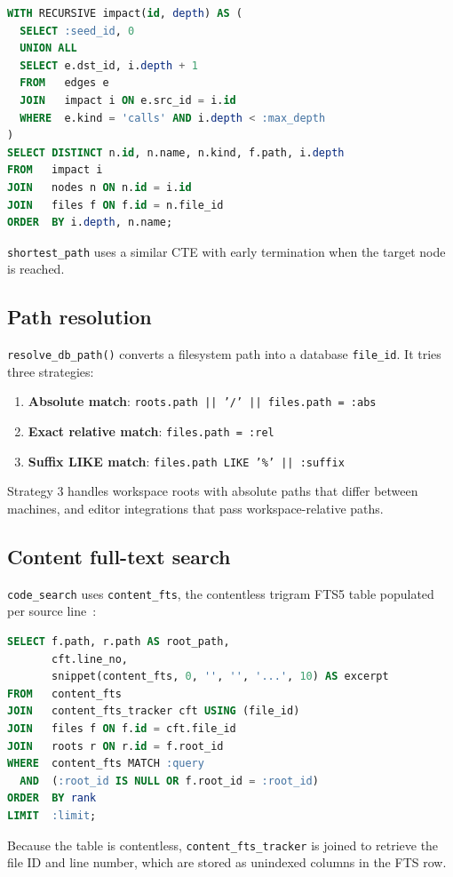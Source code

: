 \begin{lstlisting}[language=sql]
WITH RECURSIVE impact(id, depth) AS (
  SELECT :seed_id, 0
  UNION ALL
  SELECT e.dst_id, i.depth + 1
  FROM   edges e
  JOIN   impact i ON e.src_id = i.id
  WHERE  e.kind = 'calls' AND i.depth < :max_depth
)
SELECT DISTINCT n.id, n.name, n.kind, f.path, i.depth
FROM   impact i
JOIN   nodes n ON n.id = i.id
JOIN   files f ON f.id = n.file_id
ORDER  BY i.depth, n.name;
\end{lstlisting}

\texttt{shortest\_path} uses a similar CTE with early termination when the
target node is reached.

\subsection{Path resolution}

\texttt{resolve\_db\_path()} converts a filesystem path into a database
\texttt{file\_id}. It tries three strategies:

\begin{enumerate}
  \item \textbf{Absolute match}: \texttt{roots.path || '/' || files.path = :abs}
  \item \textbf{Exact relative match}: \texttt{files.path = :rel}
  \item \textbf{Suffix LIKE match}: \texttt{files.path LIKE '\%' || :suffix}
\end{enumerate}

Strategy 3 handles workspace roots with absolute paths that differ between
machines, and editor integrations that pass workspace-relative paths.

\subsection{Content full-text search}

\texttt{code\_search} uses \texttt{content\_fts}, the contentless trigram FTS5
table populated per source line~\cite{cox2012trigram}:

\begin{lstlisting}[language=sql]
SELECT f.path, r.path AS root_path,
       cft.line_no,
       snippet(content_fts, 0, '', '', '...', 10) AS excerpt
FROM   content_fts
JOIN   content_fts_tracker cft USING (file_id)
JOIN   files f ON f.id = cft.file_id
JOIN   roots r ON r.id = f.root_id
WHERE  content_fts MATCH :query
  AND  (:root_id IS NULL OR f.root_id = :root_id)
ORDER  BY rank
LIMIT  :limit;
\end{lstlisting}

Because the table is contentless, \texttt{content\_fts\_tracker} is joined to
retrieve the file ID and line number, which are stored as unindexed columns in
the FTS row.

